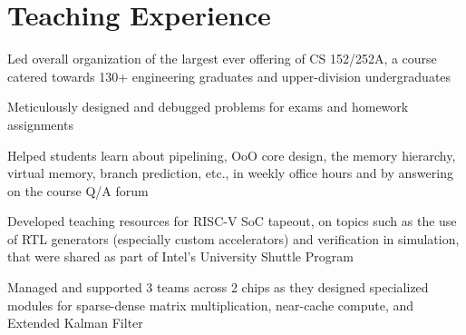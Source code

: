 \documentclass[]{deedy-resume-openfont}
\begin{document}

\section{Teaching Experience}

\vspace{\topsep} %
\begin{tightemize}
\item Led overall organization of the largest ever offering of CS 152/252A, a course catered towards 130+ engineering graduates and upper-division undergraduates
\item Meticulously designed and debugged problems for exams and homework assignments
\item Helped students learn about pipelining, OoO core design, the memory hierarchy, virtual memory, branch prediction, etc., in weekly office hours and by answering on the course Q/A forum
\end{tightemize}
\sectionsep

\vspace{\topsep}
\begin{tightemize}
\item Developed teaching resources for RISC-V SoC tapeout, on topics such as the use of RTL generators (especially custom accelerators) and verification in simulation, that were shared as part of Intel's University Shuttle Program
\item Managed and supported 3 teams across 2 chips as they designed specialized modules for sparse-dense matrix multiplication, near-cache compute, and Extended Kalman Filter
\end{tightemize}
\sectionsep
\end{document}
